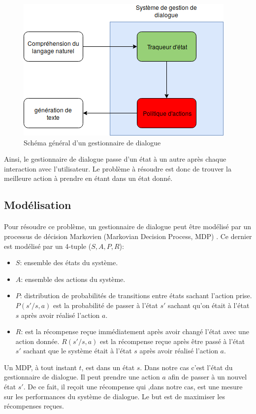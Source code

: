 \begin{figure}[H]
	\centering
	\includegraphics[width=.7\linewidth]{images/DM/DMGeneral.png} 
	\caption{Schéma général d'un gestionnaire de dialogue} 
\end{figure}
\par Ainsi, le gestionnaire de dialogue passe d'un état à un autre après chaque interaction avec l'utilisateur. Le problème à résoudre est donc de trouver la meilleure action à prendre en étant dans un état donné.
\subsection{Modélisation}\label{MDP}
\paragraph{}Pour résoudre ce problème, un gestionnaire de dialogue peut être modélisé par un processus de décision Markovien (Markovian Decision Process, MDP) \citep{Bel1957}. Ce dernier est modélisé par un 4-tuple ($S,A,P,R$):
\begin{itemize}
	\item $S$: ensemble des états du système.
	\item $A$: ensemble des actions du système.
	\item $P$: distribution de probabilités de transitions entre états sachant l'action prise. $P(s'/s,a)$ est la probabilité de passer à l'état $s'$ sachant qu'on était à l'état $s$ après avoir réalisé l'action $a$.
	\item $R$: est la récompense reçue immédiatement après avoir changé l'état avec une action donnée. $R(s'/s,a)$ est la récompense reçue après être passé à l'état $s'$ sachant que le système était à l'état $s$ après avoir réalisé l'action $a$.
\end{itemize}
Un MDP, à tout instant $t$, est dans un état $s$. Dans notre cas c'est l'état du gestionnaire de dialogue. Il peut prendre une action $a$ afin de passer à un nouvel état $s'$. De ce fait, il reçoit une récompense qui ,dans notre cas, est une mesure sur les performances du système de dialogue. Le but est de maximiser les récompenses reçues.

